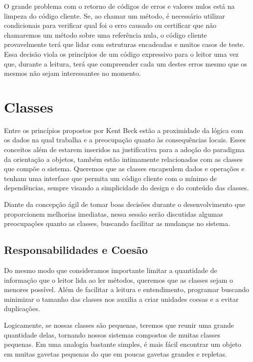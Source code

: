 O grande problema com o retorno de códigos de erros e valores nulos está na limpeza do código cliente. Se, ao chamar um método, é necessário utilizar condicionais para verificar qual foi o erro causado ou certificar que não chamaremos um método sobre uma referência nula, o código cliente provavelmente terá que lidar com estruturas encadeadas e muitos casos de teste. Essa decisão viola os princípios de um código expressivo para o leitor uma vez que, durante a leitura, terá que compreender cada um destes erros mesmo que os mesmos não sejam interessantes no momento.

\section{Classes}
\label{sec:classes}

Entre os princípios propostos por Kent Beck estão a proximidade da lógica com os dados na qual trabalha e a preocupação quanto às consequências locais. Esses conceitos além de estarem inseridos na justificativa para a adoção do paradigma da orientação a objetos, também estão intimamente relacionados com as classes que compõe o sistema. Queremos que as classes encapsulem dados e operações e tenham uma interface que permita um código cliente com o mínimo de dependências, sempre visando a simplicidade do design e do conteúdo das classes.
	
Diante da concepção ágil de tomar boas decisões durante o desenvolvimento que proporcionem melhorias imediatas, nessa sessão serão discutidas algumas preocupações quanto as classes, buscando facilitar as mudanças no sistema.

\subsection{Responsabilidades e Coesão}
Do mesmo modo que consideramos importante limitar a quantidade de informação que o leitor lida ao ler métodos, queremos que as classes sejam o menores possível. Além de facilitar a leitura e entendimento, programar buscando minimizar o tamanho das classes nos auxilia a criar unidades coesas e a evitar duplicações. 
	
Logicamente, se nossas classes são pequenas, teremos que reunir uma grande quantidade delas, tornando nossos sistemas compostos de muitas classes pequenas. Em uma analogia bastante simples, é mais fácil encontrar um objeto em muitas gavetas pequenas do que em poucas gavetas grandes e repletas.

